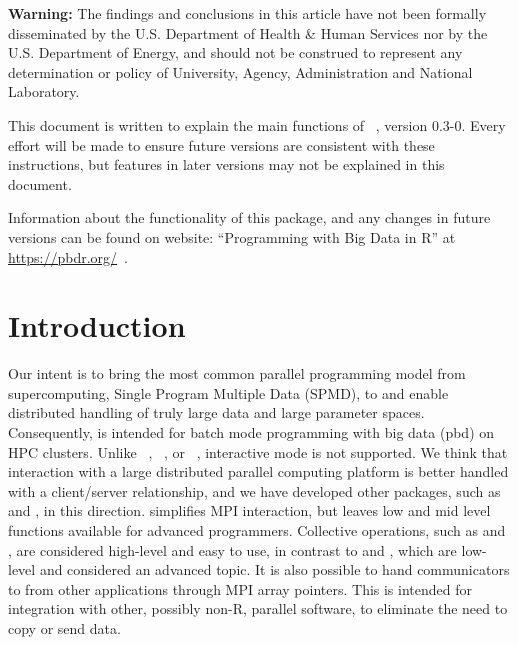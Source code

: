 
{\color{red} \bf Warning:}
The findings and conclusions in this article have not been
formally disseminated by the U.S. Department of Health \& Human Services
nor by the U.S. Department of Energy,
and should not be construed to represent any determination or
policy of University, Agency, Administration and National Laboratory.

This document is written to explain the main
functions of ~\citep{Chen2012}, version 0.3-0.
Every effort will be made to ensure future versions are consistent with
these instructions, but features in later versions may not be explained
in this document.

Information about the functionality of this package,
and any changes in future versions can be found on website:
``Programming with Big Data in R'' at
\url{https://pbdr.org/}~\citep{pbdR2012}.




\section[Introduction]{Introduction}
\label{sec:introduction}

Our intent is to bring the most common parallel programming model from
supercomputing, Single Program Multiple Data (SPMD), to 
and enable distributed handling of truly large data and large parameter
spaces. Consequently,
 is intended for batch mode programming with big data
(pbd) on HPC clusters. Unlike ~\citep{Yu2002},
~\citep{Tierney2012}, or ~\citep{Rcore},
interactive mode is not supported.  We think that interaction with a
large distributed parallel computing platform is better handled with a
client/server relationship, and we have developed other packages, such as
 and , in
this direction.   simplifies MPI interaction, but leaves
low and mid level functions available for advanced programmers. Collective
operations, such as  and , are considered
high-level and easy to use, in contrast to  and ,
which are low-level and
considered an advanced topic. It is also possible to hand communicators to
 from other applications through MPI array pointers. This is 
intended for integration with other, possibly non-R, parallel software, to
eliminate the need to copy or send data.

